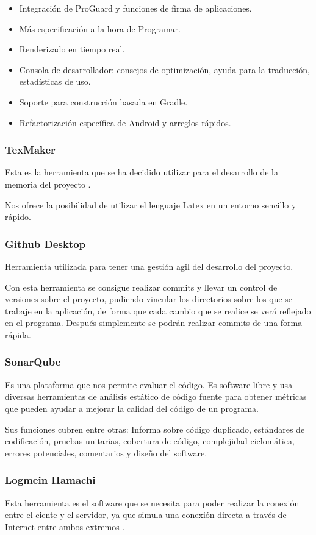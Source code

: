 \begin{itemize}
\item Integración de ProGuard y funciones de firma de aplicaciones.
\item Más especificación a la hora de Programar.
\item Renderizado en tiempo real.
\item Consola de desarrollador: consejos de optimización, ayuda para la traducción, estadísticas de uso.
\item Soporte para construcción basada en Gradle.
\item Refactorización específica de Android y arreglos rápidos.
\end{itemize}

\subsubsection{TexMaker}

Esta es la herramienta que se ha decidido utilizar para el desarrollo de la memoria del proyecto \cite{tex}. 

Nos ofrece la posibilidad de utilizar el lenguaje Latex en un entorno sencillo y rápido.

\subsubsection{Github Desktop}

Herramienta utilizada para tener una gestión agil del desarrollo del proyecto. \cite{git}

Con esta herramienta se consigue realizar commits y llevar un control de versiones sobre el proyecto, pudiendo vincular los directorios sobre los que se trabaje en la aplicación, de forma que cada cambio que se realice se verá reflejado en el programa. Después simplemente se podrán realizar commits de una forma rápida.

\subsubsection{SonarQube}

Es una plataforma que nos permite evaluar el código. Es software libre y usa diversas herramientas de análisis estático de código fuente para obtener métricas que pueden ayudar a mejorar la calidad del código de un programa. \cite{sonar2}

Sus funciones cubren entre otras: Informa sobre código duplicado, estándares de codificación, pruebas unitarias, cobertura de código, complejidad ciclomática, errores potenciales, comentarios y diseño del software.

\subsubsection{Logmein Hamachi}

Esta herramienta es el software que se necesita para poder realizar la conexión entre el ciente y el servidor, ya que simula una conexión directa a través de Internet entre ambos extremos \cite{hamachi}. 



